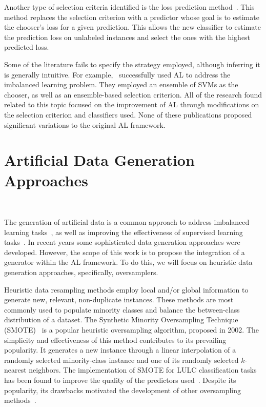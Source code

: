 \documentclass[remotesensing,article,submit,moreauthors,pdftex]{Definitions/mdpi}
\begin{document}
Another type of selection criteria identified is the loss prediction
method~\cite{Yoo2019}. This method replaces the selection criterion with a
predictor whose goal is to estimate the chooser's loss for a given
prediction. This allows the new classifier to estimate the prediction loss on
unlabeled instances and select the ones with the highest predicted loss.

Some of the literature fails to specify the strategy employed, although
inferring it is generally intuitive. For example,~\cite{Ertekin2007}
successfully used AL to address the imbalanced learning problem. They employed
an ensemble of SVMs as the chooser, as well as an ensemble-based selection
criterion. All of the research found related to this topic focused on the
improvement of AL through modifications on the selection criterion and
classifiers used. None of these publications proposed significant variations
to the original AL framework.

\section{Artificial Data Generation Approaches}~\label{sec:ovs-sota}

The generation of artificial data is a common approach to address imbalanced
learning tasks~\cite{Kaur2019}, as well as improving the effectiveness of
supervised learning tasks~\cite{DeVries2017}. In recent years some
sophisticated data generation approaches were developed. However, the scope of
this work is to propose the integration of a generator within the AL
framework. To do this, we will focus on heuristic data generation approaches,
specifically, oversamplers.

Heuristic data resampling methods employ local and/or global information to
generate new, relevant, non-duplicate instances. These methods are most
commonly used to populate minority classes and balance the between-class
distribution of a dataset. The Synthetic Minority Oversampling Technique
(SMOTE)~\cite{Chawla2002} is a popular heuristic oversampling algorithm,
proposed in 2002. The simplicity and effectiveness of this method contributes
to its prevailing popularity. It generates a new instance through a linear
interpolation of a randomly selected minority-class instance and one of its
randomly selected $k$-nearest neighbors. The implementation of SMOTE for LULC
classification tasks has been found to improve the quality of the predictors
used~\cite{Jozdani2019,Bogner2018}. Despite its popularity, its drawbacks
motivated the development of other oversampling methods~\cite{Douzas2019}.
\end{document}
